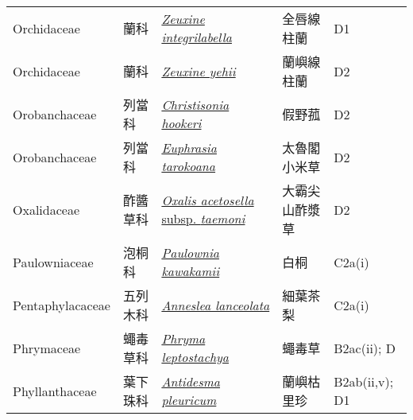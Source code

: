 {\begin{longtable}{L{2.5cm}L{2cm}L{5cm}L{2.5cm}L{3cm}}
    Orchidaceae & 蘭科 & \href{http://www.theplantlist.org/tpl1.1/search?q=Zeuxine+integrilabella}{\textit{Zeuxine integrilabella} } & 全唇線柱蘭 & D1    \\
    Orchidaceae & 蘭科 & \href{http://www.theplantlist.org/tpl1.1/search?q=Zeuxine+yehii}{\textit{Zeuxine yehii} } & 蘭嶼線柱蘭 & D2    \\
    Orobanchaceae & 列當科 & \href{http://www.theplantlist.org/tpl1.1/search?q=Christisonia+hookeri}{\textit{Christisonia hookeri} } & 假野菰 & D2    \\
    Orobanchaceae & 列當科 & \href{http://www.theplantlist.org/tpl1.1/search?q=Euphrasia+tarokoana}{\textit{Euphrasia tarokoana} } & 太魯閣小米草 & D2    \\
    Oxalidaceae & 酢醬草科 & \href{http://www.theplantlist.org/tpl1.1/search?q=Oxalis+acetosella+subsp.+taemoni}{\textit{Oxalis acetosella} subsp. \textit{taemoni} } & 大霸尖山酢漿草 & D2    \\
    Paulowniaceae & 泡桐科 & \href{http://www.theplantlist.org/tpl1.1/search?q=Paulownia+kawakamii}{\textit{Paulownia kawakamii} } & 白桐 & C2a(i)    \\
    Pentaphylacaceae & 五列木科 & \href{http://www.theplantlist.org/tpl1.1/search?q=Anneslea+lanceolata}{\textit{Anneslea lanceolata} } & 細葉茶梨 & C2a(i)    \\
    Phrymaceae & 蠅毒草科 & \href{http://www.theplantlist.org/tpl1.1/search?q=Phryma+leptostachya}{\textit{Phryma leptostachya} } & 蠅毒草 & B2ac(ii); D    \\
    Phyllanthaceae & 葉下珠科 & \href{http://www.theplantlist.org/tpl1.1/search?q=Antidesma+pleuricum}{\textit{Antidesma pleuricum} } & 蘭嶼枯里珍 & B2ab(ii,v); D1    \\

\end{longtable}}
